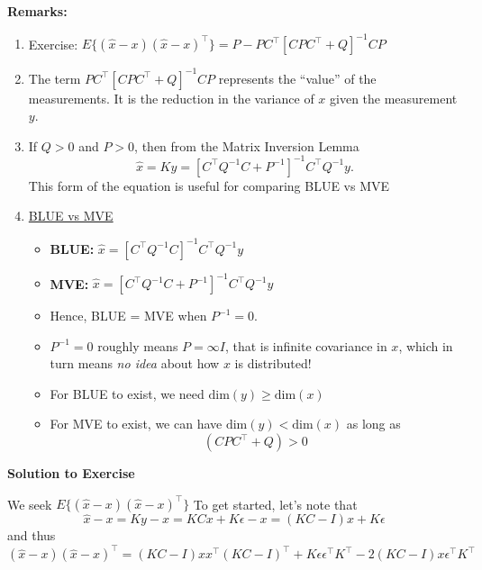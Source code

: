 \documentclass[letterpaper]{article}
\begin{document}
\textbf{Remarks:}
\begin{enumerate}
\item  Exercise: $E\{(\hat x -x)(\hat x -x)^\top \} = P-PC^\top [CPC^\top +Q]^{-1}CP$

\item The term $PC^\top [CPC^\top +Q]^{-1}CP$ represents the ``value'' of the measurements. It is the reduction in the variance of $x$ given the measurement $y$.

    \item If $Q>0$ and $P>0$, then from the Matrix Inversion Lemma
$$\boxed{\hat x = Ky = [C^\top Q^{-1}C+P^{-1}]^{-1}C^\top Q^{-1}y.}$$
This form of the equation is useful for comparing BLUE vs MVE


\item \underline{BLUE vs MVE}\\

\begin{itemize}

\item \textbf{BLUE:} $\hat x = [C^\top  Q^{-1}C]^{-1}C^\top  Q^{-1}y$ \\

\item \textbf{MVE:} $\hat x = [C^\top  Q^{-1}C+P^{-1}]^{-1}C^\top  Q^{-1}y$ \\

\item Hence, BLUE = MVE when $P^{-1} = 0$.\\

\item $P^{-1} = 0$ roughly means $P= \infty I$, that is infinite covariance in $x$, which in turn means \textit{no idea} about how $x$ is distributed!

    \item For BLUE to exist, we need $\textrm{dim}(y) \ge \textrm{dim}(x) $

    \item For MVE to exist, we can have $\textrm{dim}(y) < \textrm{dim}(x) $ as long as $$(C P C^\top + Q) >0$$

\end{itemize}

\end{enumerate}

\newpage

\centerline{\bf Solution to Exercise}

We seek $E\{(\hat x -x)(\hat x -x)^\top \}$ To get started, let's note that
$$\hat x -x = Ky-x = KC x + K \epsilon  - x=(KC - I)x + K \epsilon $$
and thus
$$ (\hat x -x)(\hat x -x)^\top= (KC - I)x x^\top (KC - I)^\top + K \epsilon \epsilon^\top K^\top - 2(KC - I)x \epsilon^\top K^\top  $$
\end{document}
